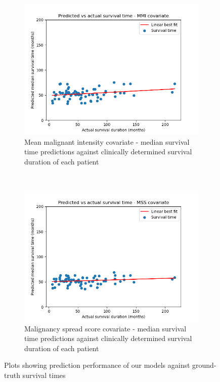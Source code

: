 \documentclass{l4proj}
\begin{document}
\begin{figure}[h]
    \centering
    \begin{subfigure}[b]{0.4\textwidth}
        \includegraphics[scale=0.45]{images/pva-mmi.png}
        \caption{Mean malignant intensity covariate - median survival time predictions against clinically determined survival duration of each patient }
        \label{fig:mss-predictions}
    \end{subfigure}\hfill%
    ~
    \begin{subfigure}[b]{0.4\textwidth}
        \includegraphics[scale=0.45]{images/pva-mss.png}
        \caption{Malignancy spread score covariate - median survival time predictions against clinically determined survival duration of each patient }
        \label{fig:mmi-predictions}
    \end{subfigure}
    \caption{Plots showing prediction performance of our models against ground-truth survival times}
    \label{fig:prediction-calibration}
\end{figure}
\end{document}
